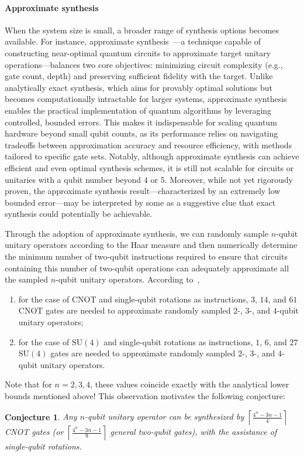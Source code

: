\documentclass[a4paper,onecolumn,11pt,unpublished]{quantumarticle}
\newtheorem{conjecture}{Conjecture}[section]
\begin{document}
\paragraph{Approximate synthesis}
When the system size is small, a broader range of synthesis options becomes available. For instance, approximate synthesis~\cite{madden2022best,Khatri2019quantumassisted,davis_heuristics_2019}---a technique capable of constructing near-optimal quantum circuits to approximate target unitary operations---balances two core objectives: minimizing circuit complexity (e.g., gate count, depth) and preserving sufficient fidelity with the target. Unlike analytically exact synthesis, which aims for provably optimal solutions but becomes computationally intractable for larger systems, approximate synthesis enables the practical implementation of quantum algorithms by leveraging controlled, bounded errors. This makes it indispensable for scaling quantum hardware beyond small qubit counts, as its performance relies on navigating tradeoffs between approximation accuracy and resource efficiency, with methods tailored to specific gate sets. Notably, although approximate synthesis can achieve efficient and even optimal synthesis schemes, it is still not scalable for circuits or unitaries with a qubit number beyond $4$ or $5$. Moreover, while not yet rigorously proven, the approximate synthesis result---characterized by an extremely low bounded error---may be interpreted by some as a suggestive clue that exact synthesis could potentially be achievable. 

Through the adoption of approximate synthesis, we can randomly sample $n$-qubit unitary operators according to the Haar measure and then numerically determine the minimum number of two-qubit instructions required to ensure that circuits containing this number of two-qubit operations can adequately approximate all the sampled $n$-qubit unitary operators. According to~\cite{Chen2024One}, 
\begin{enumerate}
\item for the case of CNOT and single-qubit rotations as instructions, $3$, $14$, and $61$ CNOT gates are needed to approximate randomly sampled $2$-, $3$-, and $4$-qubit unitary operators;
\item for the case of $\mathrm{SU}(4)$ and single-qubit rotations as instructions, $1$, $6$, and $27$ $\mathrm{SU}(4)$ gates are needed to approximate randomly sampled $2$-, $3$-, and $4$-qubit unitary operators.
\end{enumerate}
Note that for $n = 2, 3, 4$, these values coincide exactly with the analytical lower bounds mentioned above! This observation motivates the following conjecture:
\begin{conjecture}
Any $n$-qubit unitary operator can be synthesized by $\left\lceil \frac{4^n - 3n - 1}{4} \right\rceil$ CNOT gates (or $\left\lceil \frac{4^n - 3n - 1}{9} \right\rceil$ general two-qubit gates), with the assistance of single-qubit rotations.
\end{conjecture}
\end{document}

